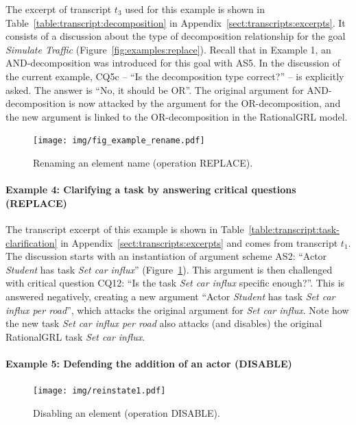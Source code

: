 The excerpt of transcript $t_3$ used for this example is shown in Table~\ref{table:transcript:decomposition} in Appendix~\ref{sect:transcripts:excerpts}. It consists of a discussion about the type of decomposition relationship for the goal \emph{Simulate Traffic} (Figure~\ref{fig:examples:replace}). Recall that in Example 1, an AND-decomposition was introduced for this goal with AS5. In the discussion of the current example, CQ5c -- ``Is the decomposition type correct?'' -- is explicitly asked. The answer is ``No, it should be OR''. The original argument for AND-decomposition is now attacked  by the argument for the OR-decomposition, and the new argument is linked to the OR-decomposition in the RationalGRL model. 


\begin{figure}[b]
\centering
\texttt{[image: img/fig\_example\_rename.pdf]}
\caption{Renaming an element name (operation \textsf{REPLACE)}.}
\label{fig:examples:clarification}
\end{figure}

\paragraph{Example 4: Clarifying a task by answering critical questions (\textsf{REPLACE})}

The transcript excerpt of this example is shown in Table~\ref{table:transcript:task-clarification} in Appendix~\ref{sect:transcripts:excerpts} and comes from transcript $t_1$. The discussion starts with an instantiation of argument scheme AS2: ``Actor \emph{Student} has task \emph{Set car influx}'' (Figure~\ref{fig:examples:clarification}). This argument is then challenged with critical question CQ12: ``Is the task \emph{Set car influx} specific enough?''. This is answered negatively, creating a new argument ``Actor \emph{Student} has task \emph{Set car influx per road}'', which attacks the original argument for \emph{Set car influx}. Note how the new task \emph{Set car influx per road} also attacks (and disables) the original RationalGRL task \emph{Set car influx}. 


\paragraph{Example 5: Defending the addition of an actor (\textsf{DISABLE)}}

\begin{figure}[t]
\centering
\texttt{[image: img/reinstate1.pdf]}
\caption{Disabling an element (operation \textsf{DISABLE)}.}
\label{fig:examples:relevant-actor}
\end{figure}

